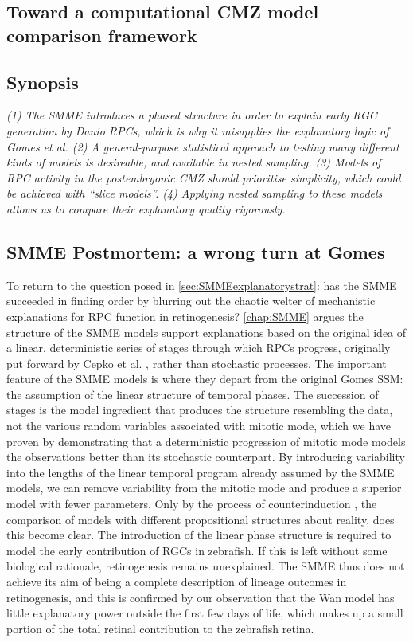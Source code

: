 \documentclass{ut-thesis}
\begin{document}
\begin{NoHyper}
\chapter{Toward a computational CMZ model comparison framework}
\label{chap:SMMEoutro}
\section*{Synopsis}
\textit{(1) The SMME introduces a phased structure in order to explain early RGC generation by \textit{Danio} RPCs, which is why it misapplies the explanatory logic of Gomes et al. \cite{Gomes2011} (2) A general-purpose statistical approach to testing many different kinds of models is desireable, and available in nested sampling. (3) Models of RPC activity in the postembryonic CMZ should prioritise simplicity, which could be achieved with ``slice models''. (4) Applying nested sampling to these models allows us to compare their explanatory quality rigorously.}

\section{SMME Postmortem: a wrong turn at Gomes}
To return to the question posed in \autoref{sec:SMMEexplanatorystrat}: has the SMME succeeded in finding order by blurring out the chaotic welter of mechanistic explanations for RPC function in retinogenesis? \autoref{chap:SMME} argues the structure of the SMME models support explanations based on the original idea of a linear, deterministic series of stages through which RPCs progress, originally put forward by Cepko et al. \cite{Cepko1996}, rather than stochastic processes. The important feature of the SMME models is where they depart from the original Gomes SSM: the assumption of the linear structure of temporal phases. The succession of stages is the model ingredient that produces the structure resembling the data, not the various random variables associated with mitotic mode, which we have proven by demonstrating that a deterministic progression of mitotic mode models the observations better than its stochastic counterpart. By introducing variability into the lengths of the linear temporal program already assumed by the SMME models, we can remove variability from the mitotic mode and produce a superior model with fewer parameters. Only by the process of counterinduction \cite{Feyerabend1993}, the comparison of models with different propositional structures about reality, does this become clear. The introduction of the linear phase structure is required to model the early contribution of RGCs in zebrafish. If this is left without some biological rationale, retinogenesis remains unexplained. The SMME thus does not achieve its aim of being a complete description of lineage outcomes in retinogenesis, and this is confirmed by our observation that the Wan model \cite{Wan2016} has little explanatory power outside the first few days of life, which makes up a small portion of the total retinal contribution to the zebrafish retina.


\end{NoHyper}
\end{document}
